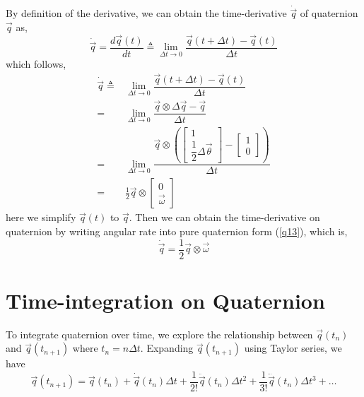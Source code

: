 By definition of the derivative, we can obtain the time-derivative $\dot{\vec{q}}$ of quaternion $\vec{q}$ as,
\begin{equation} \label{q32} 
	\dot{\vec{q}} = \dfrac{d\vec{q}(t)}{dt} \triangleq \lim_{\Delta{t} \rightarrow 0} \dfrac{\vec{q}(t+\Delta t) - \vec{q}(t)}{\Delta{t}}
\end{equation}
which follows,
\begin{equation} \label{q33} 
\begin{split}
	\dot{\vec{q}} \triangleq & \lim_{\Delta{t} \rightarrow 0} \dfrac{\vec{q}(t+\Delta t) - \vec{q}(t)}{\Delta{t}} \\
	=& \lim_{\Delta{t} \rightarrow 0} \dfrac{\vec{q} \otimes \Delta\vec{q} - \vec{q}}{\Delta{t}} \\
	=& \lim_{\Delta{t} \rightarrow 0} \dfrac{\vec{q} \otimes (\begin{bmatrix} 1 \\ \dfrac{1}{2}\Delta{\vec{\theta}} \end{bmatrix} - \begin{bmatrix} 1 \\ 0 \end{bmatrix})}{\Delta{t}} \\
	=& \frac{1}{2}\vec{q} \otimes \begin{bmatrix} 0 \\ \vec{\omega} \end{bmatrix} 
\end{split}
\end{equation}
here we simplify $\vec{q}(t)$ to $\vec{q}$. Then we can obtain the time-derivative on quaternion by writing angular rate into pure quaternion form (\ref{q13}), which is,
\begin{equation} \label{q34} 
	\dot{\vec{q}} = \frac{1}{2}\vec{q} \otimes \vec{\omega}
\end{equation}				  

\section{Time-integration on Quaternion}
\label{sec:timei_on_quat}

To integrate quaternion over time, we explore the relationship between $\vec{q}(t_n)$ and $\vec{q}(t_{n+1})$ where $t_n = n\Delta{t}$. Expanding $\vec{q}(t_{n+1})$ using Taylor series, we have
\begin{equation} \label{q35} 
	\vec{q}(t_{n+1}) = \vec{q}(t_n) + \dot{\vec{q}}(t_n)\Delta{t} + \frac{1}{2!}\ddot{\vec{q}}(t_n)\Delta{t}^2 + \frac{1}{3!}\dddot{\vec{q}}(t_n)\Delta{t}^3+\dots
\end{equation}

